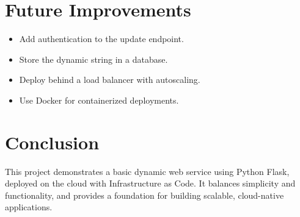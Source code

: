 \documentclass[12pt]{article}
\begin{document}
\section{Future Improvements}
\begin{itemize}
    \item Add authentication to the update endpoint.
    \item Store the dynamic string in a database.
    \item Deploy behind a load balancer with autoscaling.
    \item Use Docker for containerized deployments.
\end{itemize}

\section{Conclusion}
This project demonstrates a basic dynamic web service using Python Flask, deployed on the cloud with Infrastructure as Code. It balances simplicity and functionality, and provides a foundation for building scalable, cloud-native applications.
\end{document}
